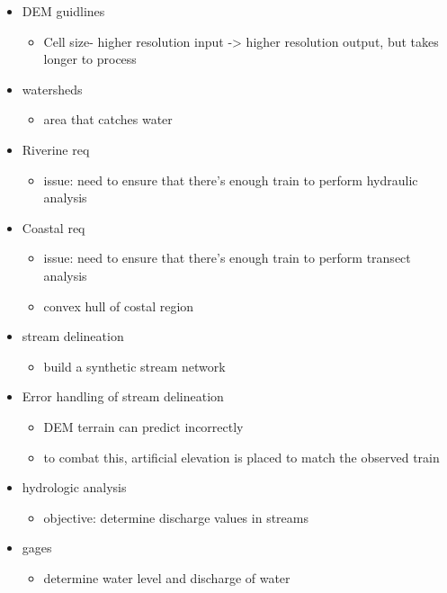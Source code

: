 \documentclass[11pt ,twoside, a4paper]{article}
\begin{document}
\begin{itemize}
	\item DEM guidlines
	\begin{itemize}
		\item Cell size- higher resolution input -> higher resolution output, but takes longer to process
	\end{itemize}
	
	\item watersheds
	\begin{itemize}
		\item area that catches water
	\end{itemize}
	
	\item Riverine req
	\begin{itemize}
		\item issue: need to ensure that there's enough train to perform hydraulic analysis
	\end{itemize}
	
	\item Coastal req
	\begin{itemize}
		\item issue: need to ensure that there's enough train to perform transect analysis
		\item convex hull of costal region
	\end{itemize}
	
	\item stream delineation
	\begin{itemize}
		\item build a synthetic stream network 
	\end{itemize}
	
	\item Error handling of stream delineation
	\begin{itemize}
		\item DEM terrain can predict incorrectly
		\item to combat this, artificial elevation is placed to match the observed train
	\end{itemize}
	
	\item hydrologic analysis
	\begin{itemize}
		\item objective: determine discharge values in streams
	\end{itemize}

	\item gages
	\begin{itemize}
		\item determine water level and discharge of water
	\end{itemize}
	

\end{itemize}
\end{document}
